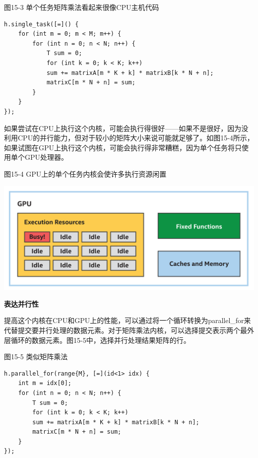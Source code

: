 \hspace*{\fill} \par %
图15-3 单个任务矩阵乘法看起来很像CPU主机代码
\begin{lstlisting}[caption={}]
h.single_task([=]() {
	for (int m = 0; m < M; m++) {
		for (int n = 0; n < N; n++) {
			T sum = 0;
			for (int k = 0; k < K; k++)
			sum += matrixA[m * K + k] * matrixB[k * N + n];
			matrixC[m * N + n] = sum;
		}
	}
});
\end{lstlisting}

如果尝试在CPU上执行这个内核，可能会执行得很好——如果不是很好，因为没利用CPU的并行能力，但对于较小的矩阵大小来说可能就足够了。如图15-4所示，如果试图在GPU上执行这个内核，可能会执行得非常糟糕，因为单个任务将只使用单个GPU处理器。\par

\hspace*{\fill} \par %
图15-4 GPU上的单个任务内核会使许多执行资源闲置
\begin{center}
	\includegraphics[width=1.0\textwidth]{content/chapter-15/images/4}
\end{center}

\hspace*{\fill} \par %
\textbf{表达并行性}

提高这个内核在CPU和GPU上的性能，可以通过将一个循环转换为parallel\_for来代替提交要并行处理的数据元素。对于矩阵乘法内核，可以选择提交表示两个最外层循环的数据元素。图15-5中，选择并行处理结果矩阵的行。\par

\hspace*{\fill} \par %
图15-5 类似矩阵乘法
\begin{lstlisting}[caption={}]
h.parallel_for(range{M}, [=](id<1> idx) {
	int m = idx[0];
	for (int n = 0; n < N; n++) {
		T sum = 0;
		for (int k = 0; k < K; k++)
		sum += matrixA[m * K + k] * matrixB[k * N + n];
		matrixC[m * N + n] = sum;
	}
});
\end{lstlisting}

